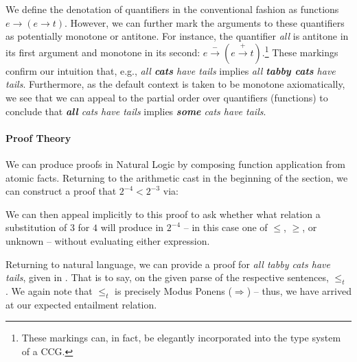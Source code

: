 We define the denotation of quantifiers in the conventional
  fashion as functions $e \rightarrow (e \rightarrow t)$.
However, we can further mark the arguments to these quantifiers as
  potentially monotone or antitone.
For instance, the quantifier \textit{all} is antitone in its first
  argument and monotone in its second:
  $e \xrightarrow{-} (e \xrightarrow{+} t)$.\footnote{
    These markings can, in fact, be elegantly incorporated into the
    type system \cite{key:2014icard-natlog} of a CCG.
  }
These markings confirm our intuition that, e.g., 
  \textit{all \textbf{cats} have tails}
  implies 
  \textit{all \textbf{tabby cats} have tails}.
Furthermore, as the default context is taken to be monotone
  axiomatically, we see that we can appeal to the partial order
  over quantifiers (functions) to conclude that
  \textit{\textbf{all} cats have tails}
  implies 
  \textit{\textbf{some} cats have tails}.

\paragraph{Proof Theory}
We can produce proofs in Natural Logic by composing
  function application from atomic facts.
Returning to the arithmetic cast in the beginning of the section, we
  can construct a proof that $2^{-4} < 2^{-3}$ via:

\begin{prooftree}
\end{prooftree}

We can then appeal implicitly to this proof to ask whether what relation
  a substitution of $3$ for $4$ will produce in $2^{-4}$ -- in this case
  one of $\leq$, $\geq$, or unknown -- without evaluating either
  expression.


Returning to natural language, we can provide a proof for
  \textit{all tabby cats have tails}, given in .
That is to say, on the given parse of the respective sentences,
   $\leq_t$ .
We again note that $\leq_t$ is precisely Modus
  Ponens ($\Rightarrow$) -- thus, we have arrived at our expected
  entailment relation.

